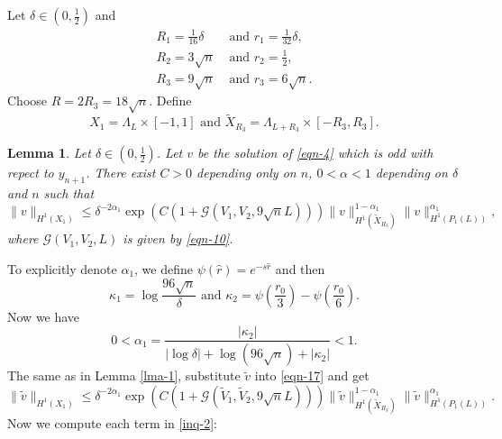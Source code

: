 \documentclass[12pt]{amsart}
\newtheorem{lemma}[theorem]{Lemma}
\theoremstyle{definition}
\begin{document}
Let $\delta\in (0,\frac{1}{2})$ and
\begin{equation*}
	\begin{aligned}
		R_1=\frac{1}{16}\delta & \text{ and }r_1=\frac{1}{32}\delta, \\
		R_2=3\sqrt{n} & \text{ and } r_2=\frac{1}{2},\\
		R_3=9\sqrt{n} & \text{ and } r_3=6\sqrt{n}.
	\end{aligned} 
\end{equation*}
Choose $R=2R_3=18\sqrt{n} $. Define
\begin{equation}
	X_1=\Lambda_L\times [-1,1] \text{ and }\widetilde{X}_{R_3}=\Lambda_{L+R_3}\times [-R_3,R_3].
\end{equation}
\begin{lemma}\label{lma-2}
	Let $\delta \in (0,\frac{1}{2})$. Let $v$ be the solution of \eqref{eqn-4} which is odd with repect to $y_{n+1}$. There exist $C>0$ depending only on $n$, $0<\alpha <1$ depending on $\delta$ and $n$ such that
	\begin{equation}\label{eqn-17}
		\|v\|_{H^{1}(X_1)}\le \delta^{-2\alpha _1}\exp\left( C\left( 1+\mathcal{G}\left( V_1,V_2,9\sqrt{n} L \right)  \right)  \right) \|v\|^{1-\alpha _1}_{H^{1}\left( \widetilde{X}_{R_3} \right) }\|v\|^{\alpha_1}_{H^{1}\left( P_1(L) \right) },
	\end{equation}
	where $\mathcal{G}(V_1,V_2,L)$ is given by \eqref{eqn-10}. 
\end{lemma}
To explicitly denote $\alpha _1$, we define $\psi(\widehat{r})=e^{-s\widehat{r}}$ and then
\begin{equation}
	\kappa_1= \log \frac{96 \sqrt{n} }{\delta} \text{  and }\kappa_2= \psi\left( \frac{r_0}{3} \right) -\psi\left( \frac{r_0}{6} \right).
\end{equation}
Now we have
\begin{equation}
	0<\alpha_1= \frac{|\kappa_2|}{|\log \delta|+\log (96\sqrt{n})+|\kappa_2| }<1.
\end{equation}
The same as in Lemma \ref{lma-1}, substitute $\widetilde{v}$ into \eqref{eqn-17} and get
\begin{equation}
	\|\widetilde{v}\|_{H^{1}(X_1)}\le \delta^{-2\alpha _1}\exp\left( C\left( 1+\mathcal{G}\left( \widetilde{V}_1,\widetilde{V}_2,9\sqrt{n} L \right)  \right)  \right) \|\widetilde{v}\|^{1-\alpha _1}_{H^{1}\left( \widetilde{X}_{R_3} \right) }\|\widetilde{v}\|^{\alpha_1}_{H^{1}\left( P_1(L) \right) }.\label{inq-2}
\end{equation}
Now we compute each term in \eqref{inq-2}:
\end{document}
